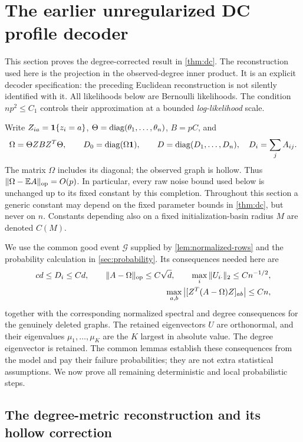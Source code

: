 \section{The earlier unregularized DC profile decoder}
\label{sec:dcsbm-proof}

This section proves the degree-corrected result in \cref{thm:dc}.
The reconstruction used here is the projection in the observed-degree
inner product.  It is an explicit decoder specification: the preceding
Euclidean reconstruction is not silently identified with it.
All likelihoods below are Bernoulli likelihoods.  The condition
\(np^2\le C_1\) controls their approximation at a bounded \emph{log-likelihood}
scale.

Write \(Z_{ia}=\mathbf1\{z_i=a\}\), \(\Theta=\operatorname{diag}(\theta_1,\ldots,\theta_n)\),
\(B=pC\), and
\[
 \Omega=\Theta ZBZ^T\Theta,\qquad
 D_0=\operatorname{diag}(\Omega\mathbf 1),\qquad
 D=\operatorname{diag}(D_1,\ldots,D_n),\quad D_i=\sum_jA_{ij}.
\]
The matrix \(\Omega\) includes its diagonal; the observed graph is hollow.
Thus \(\|\Omega-\mathbb E A\|_{\mathrm{op}}=O(p)\).  In particular, every raw noise
bound used below is unchanged up to its fixed constant by this completion.
Throughout this section a generic constant may depend on the fixed
parameter bounds in \cref{thm:dc}, but never on \(n\).  Constants depending
also on a fixed initialization-basin radius \(M\) are denoted \(C(M)\).

We use the common good event \(\mathcal G\) supplied by
\cref{lem:normalized-rows} and the probability calculation in
\cref{sec:probability}.  Its consequences needed here are
\begin{align}
 c d\le D_i\le C d,\qquad
 \|A-\Omega\|_{\mathrm{op}}\le C\sqrt d,\qquad
 \max_i\|U_{i\cdot}\|_2\le Cn^{-1/2},                    \label{dcsbm:good}\\
 \max_{a,b}\left\lvert[Z^T(A-\Omega)Z]_{ab}\right\rvert\le Cn,           \label{dcsbm:block-event}
\end{align}
together with the corresponding normalized spectral and degree
consequences for the genuinely deleted graphs.  The retained eigenvectors
\(U\) are orthonormal, and their eigenvalues \(\mu_1,\ldots,\mu_K\)
are the \(K\) largest in absolute value.  The degree eigenvector is retained.
The common lemmas establish these consequences from the model and pay
their failure probabilities; they are not extra statistical assumptions.
We now prove all remaining deterministic and local probabilistic steps.

\subsection{The degree-metric reconstruction and its hollow correction}

